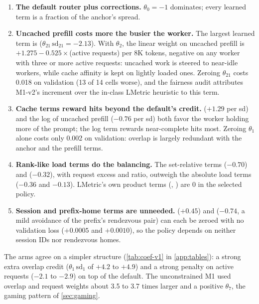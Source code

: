 \begin{enumerate}
  \item \textbf{The default router plus corrections.} $\theta_0 = -1$ dominates; every learned term
    is a fraction of the anchor's spread.
  \item \textbf{Uncached prefill costs more the busier the worker.} The largest learned term is
     ($\theta_{21}\,\mathrm{sd}_{21} = -2.13$). With $\theta_2$, the
    linear weight on uncached prefill is $+1.275 - 0.525 \times$(active requests) per 8K tokens,
    negative on any worker with three or more active requests: uncached work is steered to near-idle
    workers, while cache affinity is kept on lightly loaded ones. Zeroing $\theta_{21}$ costs 0.018 on
    validation (13 of 14 cells worse), and the fairness audit attributes M1-v2's increment over the
    in-class LMetric heuristic to this term.
  \item \textbf{Cache terms reward hits beyond the default's credit.} 
    ($+1.29$ per sd) and the log of uncached prefill ($-0.76$ per sd) both favor the worker holding
    more of the prompt; the log term rewards near-complete hits most. Zeroing $\theta_1$ alone costs
    only 0.002 on validation: overlap is largely redundant with the anchor and the prefill terms.
  \item \textbf{Rank-like load terms do the balancing.} The set-relative terms
     ($-0.70$) and  ($-0.32$),
    with request excess and ratio, outweigh the absolute load terms ($-0.36$ and $-0.13$). LMetric's
    own product terms (, ) are 0 in the selected policy.
  \item \textbf{Session and prefix-home terms are unneeded.}  ($+0.45$) and
     ($-0.74$, a mild avoidance of the prefix's rendezvous pair) can each be zeroed
    with no validation loss ($+0.0005$ and $+0.0010$), so the policy depends on neither session IDs
    nor rendezvous homes.
\end{enumerate}

The  arms agree on a simpler structure (\cref{tab:coef-v1} in \cref{app:tables}): a strong extra
overlap credit ($\theta_1\,\mathrm{sd}_1$ of $+4.2$ to $+4.9$) and a strong penalty on active requests
($-2.1$ to $-2.9$) on top of the default. The unconstrained M1 used overlap and request weights about
3.5 to 3.7 times larger and a positive $\theta_7$, the gaming pattern of \cref{sec:gaming}.

